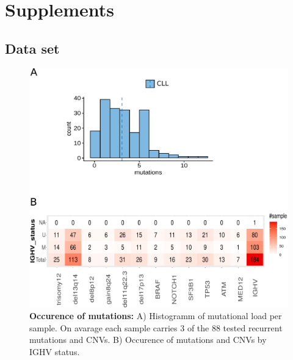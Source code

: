 
\section{Supplements}

\subsection{Data set}

\FloatBarrier

\begin{figure}
	\centering
	\includegraphics[width=\columnwidth]{figures/Data_overview_mut.pdf}
	\caption{\textbf{Occurence of mutations:} A) Histogramm of mutational load per sample. On avarage each sample carries 3 of the 88 tested recurrent mutations and CNVs. B) Occurence of mutations and CNVs by IGHV status.}
	\label{fig:mutation_overview}
\end{figure}


\FloatBarrier